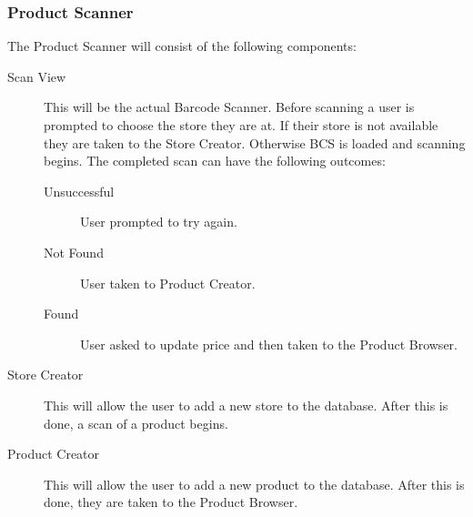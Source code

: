 \subsubsection{Product Scanner}

The Product Scanner will consist of the following components:

\begin{description}
\item[Scan View] This will be the actual Barcode Scanner. Before scanning a user is prompted to choose the store they are at. If their store is not
available they are taken to the Store Creator. Otherwise BCS is loaded and scanning begins. The completed scan can have the following outcomes:
\begin{description}
  \item[Unsuccessful] User prompted to try again.
  \item[Not Found] User taken to Product Creator.
  \item[Found] User asked to update price and then taken to the Product Browser.
\end{description}
\item[Store Creator] This will allow the user to add a new store to the database. After this is done, a scan of a product begins.
\item[Product Creator] This will allow the user to add a new product to the database. After this is done, they are taken to the Product Browser.
\end{description} 

